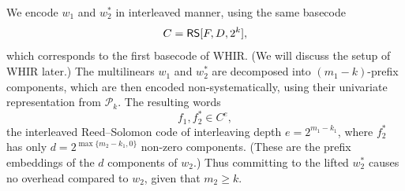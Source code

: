 We encode $w_1$ and $w_2^*$ in interleaved manner, using the same basecode
\begin{equation}
\label{e:base:code}
C = \mathsf{RS}[F,D, 2^{k}],
\end{equation}
which corresponds to the first basecode of WHIR.
(We will discuss the setup of WHIR later.)
The multilinears $w_1$ and $w_2^*$ are decomposed into $(m_1 - k)$-prefix components, 
which are then encoded non-systematically, using their univariate representation from $\mathscr P_{k}$.
The resulting words 
\[
f_1, f_2^* \in C^{e},
\]
the interleaved Reed--Solomon code of interleaving depth $e = 2^{m_1-k_1}$, 
where $f_2^*$ has only $d = 2^{\max\{m_2-k_1,0\}}$ non-zero components. 
(These are the prefix embeddings of the $d$ components of $w_2$.)
Thus committing to the lifted $w_2^*$ causes no overhead compared to $w_2$, given that $m_2 \geq k$.











